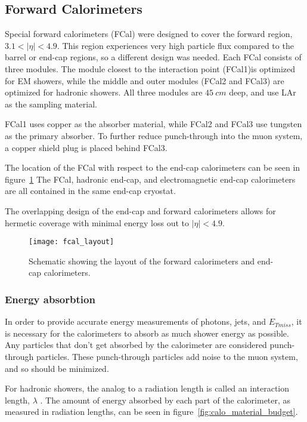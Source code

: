 \subsection{Forward Calorimeters}\label{subsec:fcal}

Special forward calorimeters (FCal) were designed to cover the forward region, $3.1 < |\eta| < 4.9$.
This region experiences very high particle flux compared to the barrel or end-cap regions, so a different design was needed.
Each FCal consists of three modules.
The module closest to the interaction point (FCal1)is optimized for EM showers,
while the middle and outer modules (FCal2 and FCal3) are optimized for hadronic showers.
All three modules are $45~cm$ deep, and use LAr as the sampling material.

FCal1 uses copper as the absorber material, while FCal2 and FCal3 use tungsten as the primary absorber.
To further reduce punch-through into the muon system, a copper shield plug is placed behind FCal3.

The location of the FCal with respect to the end-cap calorimeters can be seen in figure~\ref{fig:fcal_layout}
The FCal, hadronic end-cap, and electromagnetic end-cap calorimeters are all contained in the same end-cap cryostat.

The overlapping design of the end-cap and forward calorimeters allows for hermetic coverage with minimal energy loss out to $|\eta| < 4.9$.

\begin{figure}[h]
\texttt{[image: fcal\_layout]}
\caption{Schematic showing the layout of the forward calorimeters and end-cap calorimeters.}
\label{fig:fcal_layout}\cite{atlas-detector-2008}
\end{figure}

\subsubsection{Energy absorbtion}
In order to provide accurate energy measurements of photons, jets, and $E_{Tmiss}$,
it is necessary for the calorimeters to absorb as much shower energy as possible.
Any particles that don't get absorbed by the calorimeter are considered punch-through particles.
These punch-through particles add noise to the muon system, and so should be minimized.

For hadronic showers, the analog to a radiation length is called an interaction length, $\lambda$ .
The amount of energy absorbed by each part of the calorimeter, as measured in radiation lengths, can be seen in figure~\ref{fig:calo_material_budget}.

